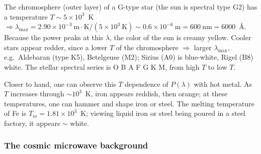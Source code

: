\begin{diagram}
\end{diagram}

The chromosphere (outer layer) of a G-type star (the sun is spectral type G2) has a temperature $T\sim 5\times 10^3$~K
$\Rightarrow\lambda_{\max} = 2.90\times 10^{-3}\ \text{m}\cdot\text{K}/(5\times 10^3\ \text{K})\sim 0.6\times 10^{-6}\ \text{m} = 600\ \text{nm} = 6000$~\AA.
Because the power peaks at this $\lambda$, the color of the sun is creamy yellow. Cooler stars appear redder, since a lower $T$ of the
chromosphere $\Rightarrow$ larger $\lambda_{\max}$, e.g.\ Aldebaran (type K5), Betelgeuse (M2); Sirius (A0) is blue-white, Rigel (B8)
white. The stellar spectral series is O B A F G K M, from high $T$ to low $T$.

Closer to hand, one can observe this $T$ dependence of $P(\lambda)$ with hot metal. As $T$ increases through $\sim 10^3$~K, iron
appears reddish, then orange; at these temperatures, one can hammer and shape iron or steel. The melting temperature of Fe is
$T_m = 1.81\times 10^3$~K; viewing liquid iron or steel being poured in a steel factory, it appears $\sim$ white.

\subsubsection*{The cosmic microwave background}

